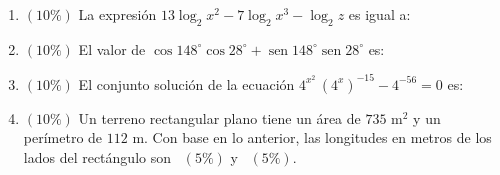 \documentclass[11pt]{article}
\newcommand{\resp}{\ \underline{\hspace{3.2cm}}}
\newcommand{\resplong}{\par\vspace{2pt}\noindent\underline{\hspace{9cm}}\par\vspace{6pt}}
\begin{document}
\begin{enumerate}
\item $(10\%)$ La expresión $13\log_2 x^2 - 7\log_2 x^3 - \log_2 z$ es igual a:

\item $(10\%)$ El valor de $\cos 148^\circ \cos 28^\circ + \operatorname{sen} 148^\circ \operatorname{sen} 28^\circ$ es:

\item $(10\%)$ El conjunto solución de la ecuación $4^{x^2}\,(4^x)^{-15} - 4^{-56} = 0$ es:\resplong

\item $(10\%)$ Un terreno rectangular plano tiene un área de $735$ m$^2$ y un perímetro de $112$ m. Con base en lo anterior, las longitudes en metros de los lados del rectángulo son \resp $(5\%)$ y \resp $(5\%)$.
\end{enumerate}

\vfill
{}
\end{document}
